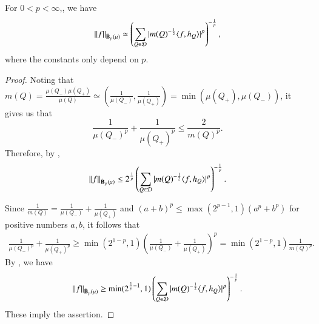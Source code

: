 \documentclass[leqno]{amsart}
\begin{document}
\begin{proposition}\label{equivalent besov}
For $0<p<\infty$,, we have
\begin{align*}
\left\| f \right\|_{\dot{\mathbf B}_{p}(\mu)}\simeq
\left(\sum_{Q\in{\mathcal D}}|m(Q)^{-\frac{1}{2}}\langle f,h_{Q} \rangle|^{p}\right)^{-\frac{1}{p}},
\end{align*}
where the constants only depend on $p$.
\end{proposition}
\begin{proof}
Noting that $m(Q)=\frac{\mu(Q_{-})\mu(Q_{+})}{\mu(Q)}
\simeq\left(\frac{1}{\mu(Q_{-})},\frac{1}{\mu(Q_{+})}\right)=\min(\mu(Q_{+}),\mu(Q_{-}))$, it gives us that $$\frac{1}{\mu(Q_{-})^{p}}+\frac{1}{\mu(Q_{+})^{p}}\leq\frac{2}{m(Q)^{p}}.$$
Therefore, by ,
\begin{align*}
\left\| f \right\|_{\dot{\mathbf B}_{p}(\mu)}\leq
2^{\frac{1}{p}}\left(\sum_{Q\in{\mathcal D}}|m(Q)^{-\frac{1}{2}}\langle f,h_{Q} \rangle|^{p}\right)^{-\frac{1}{p}}.
\end{align*}

Since $\frac{1}{m(Q)}=\frac{1}{\mu(Q_{-})}+\frac{1}{\mu(Q_{+})}$ and $(a+b)^{p}\leq\max(2^{p-1},1)(a^{p}+b^{p})$ for positive numbers $a,b$, it follows that
\begin{align*}
\frac{1}{\mu(Q_{-})^{p}}+\frac{1}{\mu(Q_{+})^{p}}
\geq\min(2^{1-p},1)(\frac{1}{\mu(Q_{-})}+\frac{1}{\mu(Q_{+})})^{p}
=\min(2^{1-p},1)\frac{1}{m(Q)^{p}}.
\end{align*}
By , we have
\begin{align*}
\left\| f \right\|_{\dot{\mathbf B}_{p}(\mu)}\geq
\min(2^{\frac{1}{p}-1},1)\left(\sum_{Q\in{\mathcal D}}|m(Q)^{-\frac{1}{2}}\langle f,h_{Q} \rangle|^{p}\right)^{-\frac{1}{p}}.
\end{align*}
These imply the assertion.

\end{proof}
\end{document}
